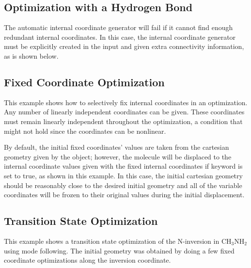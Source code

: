 

\subsection{Optimization with a Hydrogen Bond}

The automatic internal coordinate generator will fail if it cannot find
enough redundant internal coordinates.  In this case, the internal
coordinate generator must be explicitly created in the input and given
extra connectivity information, as is shown below.



\subsection{Fixed Coordinate Optimization}
\label{fixedexample}

 This example shows how to selectively fix internal coordinates in an
optimization.  Any number of linearly independent coordinates can be given.
These coordinates must remain linearly independent throughout the
optimization, a condition that might not hold since the coordinates can be
nonlinear.

 By default, the initial fixed coordinates' values are taken from the
cartesian geometry given by the  object; however, the
molecule will be displaced to the internal coordinate values given with the
fixed internal coordinates if  keyword is set to
true, as shown in this example.  In this case, the initial cartesian
geometry should be reasonably close to the desired initial geometry and all
of the variable coordinates will be frozen to their original values during
the initial displacement.



\subsection{Transition State Optimization}
\label{tsexample}

This example shows a transition state optimization of the N-inversion in
$\mathrm{CH}_3\mathrm{NH}_2$ using mode following.  The initial geometry
was obtained by doing a few fixed coordinate optimizations along the
inversion coordinate.


